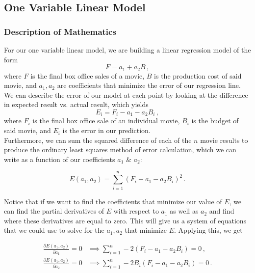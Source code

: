 \documentclass[11pt]{article}
\begin{document}
\subsection{One Variable Linear Model}
\subsubsection{Description of Mathematics}
\label{one-variable-math-desc}
For our one variable linear model, we are building a linear regression model of the form
\begin{equation*}
    F = a_1 + a_2 B \, ,
\end{equation*}
where $F$ is the final box office sales of a movie, $B$ is the production cost of said movie, and $a_1, a_2$ are coefficients that minimize the error of our regression line.
We can describe the error of our model at each point by looking at the difference in expected result vs. actual result, which yields
\begin{equation*}
    E_i = F_i - a_1 - a_2 B_i \, ,
\end{equation*}
where $F_i$ is the final box office sale of an individual movie, $B_i$ is the budget of said movie, and $E_i$ is the error in our prediction. 
\\

Furthermore, we can sum the squared difference of each of the $n$ movie results to produce the ordinary least squares method of error calculation, which we can write as a function of our coefficients $a_1$ \& $a_2$:

\label{one-var-linear-ols-error}
\begin{equation*}
    E(a_1, a_2) = \sum_{i=1}^{n}(F_i - a_1 - a_2 B_i)^2 \, .
\end{equation*}

Notice that if we want to find the coefficients that minimize our value of $E$, we can find the partial derivatives of $E$ with respect to $a_1$ as well as $a_2$ and find where these derivatives are equal to zero.  
This will give us a system of equations that we could use to solve for the $a_1, a_2$ that minimize $E$.  
Applying this, we get


\begin{align*}
    \frac{\partial E(a_1, a_2)}{\partial a_1} = 0 & \implies \sum_{i=1}^{n} -2 (F_i - a_1 - a_2 B_i) = 0\, ,\\
    \frac{\partial E(a_1, a_2)}{\partial a_2} = 0 & \implies \sum_{i=1}^{n} -2 B_i (F_i - a_1 - a_2 B_i) = 0\,.
\end{align*}
\end{document}
